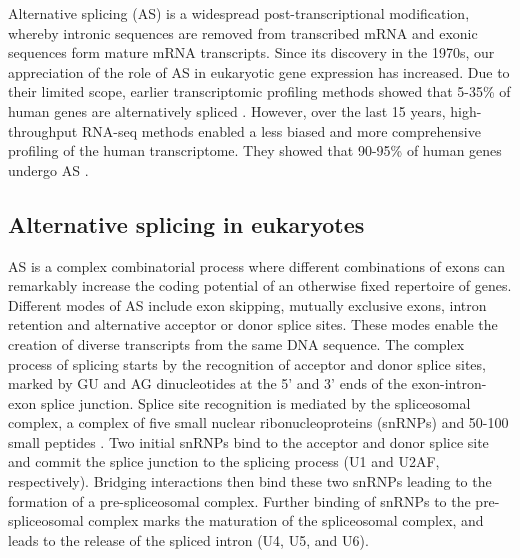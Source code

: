 Alternative splicing (AS) is a widespread post-transcriptional modification, whereby intronic sequences are removed from transcribed mRNA and exonic sequences form mature mRNA transcripts. Since its discovery in the 1970s, our appreciation of the role of AS in eukaryotic gene expression has increased. Due to their limited scope, earlier transcriptomic profiling methods showed that 5-35\% of human genes are alternatively spliced \cite{Sharp1994-nz,Mironov1999-qo}. However, over the last 15 years, high-throughput RNA-seq methods enabled a less biased and more comprehensive profiling of the human transcriptome. They showed that 90-95\% of human genes undergo AS \cite{Pan2008-qe}. 

\subsection{Alternative splicing in eukaryotes}

AS is a complex combinatorial process where different combinations of exons can remarkably increase the coding potential of an otherwise fixed repertoire of genes. Different modes of AS include exon skipping, mutually exclusive exons, intron retention and alternative acceptor or donor splice sites. These modes enable the creation of diverse transcripts from the same DNA sequence. The complex process of splicing starts by the recognition of acceptor and donor splice sites, marked by GU and AG dinucleotides at the 5' and 3' ends of the exon-intron-exon splice junction. Splice site recognition is mediated by the spliceosomal complex, a complex of five small nuclear ribonucleoproteins (snRNPs) and 50-100 small peptides \cite{Kramer1996-qj}. Two initial snRNPs bind to the acceptor and donor splice site and commit the splice junction to the splicing process (U1 and U2AF, respectively). Bridging interactions then bind these two snRNPs leading to the formation of a pre-spliceosomal complex. Further binding of snRNPs to the pre-spliceosomal complex marks the maturation of the spliceosomal complex, and leads to the release of the spliced intron (U4, U5, and U6).\\


